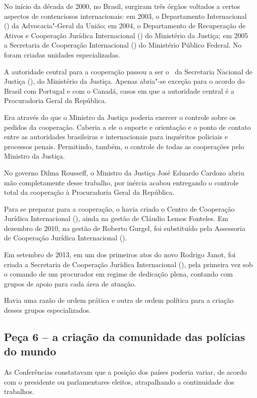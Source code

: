 No início da década de 2000, no Brasil, surgiram três órgãos voltados a
certos aspectos de contenciosos internacionais: em 2003, o Departamento
Internacional () da Advocacia"-Geral da União; em 2004, o Departamento
de Recuperação de Ativos e Cooperação Jurídica Internacional () do
Ministério da Justiça; em 2005 a Secretaria de Cooperação Internacional
() do Ministério Público Federal. No  foram criadas unidades
especializadas.

A autoridade central para a cooperação passou a ser o  ~da
Secretaria Nacional de Justiça (), do Ministério da Justiça. Apenas
abria"-se exceção para o acordo do Brasil com Portugal e com o Canadá,
casos em que a autoridade central é a Procuradoria Geral da República.

Era através do  que o Ministro da Justiça poderia exercer o controle
sobre os pedidos da cooperação. Caberia a ele o suporte e orientação e o
ponto de contato entre as autoridades brasileiras e internacionais para
inquéritos policiais e processos penais. Permitindo, também, o controle
de todas as cooperações pelo Ministro da Justiça.

No governo Dilma Rousseff, o Ministro da Justiça José Eduardo Cardozo
abriu mão completamente desse trabalho, por inércia acabou entregando o
controle total da cooperação à Procuradoria Geral da República.

Para se preparar para a cooperação, o  havia criado o Centro de
Cooperação Jurídica Internacional (), ainda na gestão de Cláudio
Lemos Fonteles. Em dezembro de 2010, na gestão de Roberto Gurgel, foi
substituído pela Assessoria de Cooperação Jurídica Internacional
().

Em setembro de 2013, em um dos primeiros atos do novo  Rodrigo Janot,
foi criada a Secretaria de Cooperação Jurídica Internacional (), pela
primeira vez sob o comando de um procurador em regime de dedicação
plena, contando com grupos de apoio para cada área de atuação.

Havia uma razão de ordem prática e outra de ordem política para a
criação desses grupos especializados.

\subsection{Peça 6 -- a criação da comunidade das polícias do mundo}

As Conferências constatavam que a posição dos países poderia variar, de
acordo com o presidente ou parlamentares eleitos, atrapalhando a
continuidade dos trabalhos.

